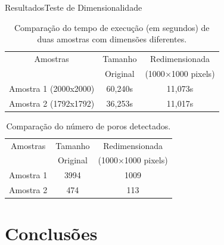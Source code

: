 \documentclass{beamer}
\begin{document}
\begin{frame}{Resultados}{Teste de Dimensionalidade}
    
    \begin{table}[!htb]
    \setlength{\tabcolsep}{3.0mm}
    \centering
    \caption{Comparação do tempo de execução (em segundos) de duas amostras com dimensões diferentes.}
    \label{tab:tab_tempo}
    \begin{tabular}{ccc}
    \toprule
    Amostras & \multicolumn{1}{c}{Tamanho}  & \multicolumn{1}{c}{Redimensionada} \\
             & \multicolumn{1}{c}{Original} & \multicolumn{1}{c}{(1000$\times$1000 pixels)} \\
    \midrule
    Amostra 1 (2000x2000) & 60,240s & 11,073s \\
    Amostra 2 (1792x1792) & 36,253s & 11,017s \\
    \bottomrule
    \end{tabular}
    \end{table}
    
    \begin{table}[!htb]
    \setlength{\tabcolsep}{3.0mm}
    \centering
    \caption{Comparação do número de poros detectados.}
    \label{tab:tab_poro}
    \begin{tabular}{ccc}
    \toprule
    Amostras & \multicolumn{1}{c}{Tamanho}  & \multicolumn{1}{c}{Redimensionada} \\
             & \multicolumn{1}{c}{Original} & \multicolumn{1}{c}{(1000$\times$1000 pixels)} \\
    \midrule
    Amostra 1 & 3994 & 1009 \\
    Amostra 2 &  474 &  113 \\
    \bottomrule
    \end{tabular}
    \end{table}
\end{frame}

\section{Conclusões}
\end{document}
